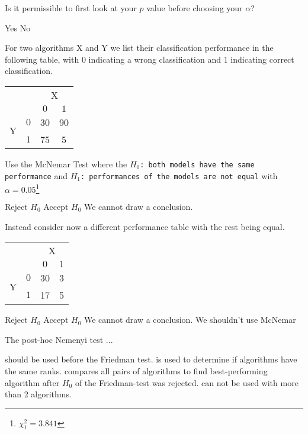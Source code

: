 \documentclass{exam}
\begin{document}
\begin{questions}
\question Is it permissible to first look at your $p$ value before choosing your $\alpha$?
\begin{choices}
    \choice Yes
    \choice No %
\end{choices}

\question For two algorithms X and Y we list their classification performance in the following table, with $0$ indicating a wrong classification and $1$ indicating correct classification.
    \begin{center}
      \begin{tabular}{cc|cc}
          & & \multicolumn{2}{c}{X} \\
          & & $0$ & $1$ \\
          \hline
          \multirow{2}{*}{Y} & $0$ & 30 & 90 \\
          & $1$ & 75 & 5 \\
      \end{tabular}
    \end{center}
    Use the McNemar Test where the \texttt{$H_0$: both models have the same performance} and \texttt{$H_1$: performances of the models are not equal}  with $\alpha = 0.05$\footnote{$\chi^2_1 = 3.841$}
\begin{choices}
    \choice Reject $H_0$
    \choice Accept $H_0$
    \choice We cannot draw a conclusion. %
\end{choices}

\question Instead consider now a different performance table with the rest being equal.
    \begin{center}
      \begin{tabular}{cc|cc}
          & & \multicolumn{2}{c}{X} \\
          & & $0$ & $1$ \\
          \hline
          \multirow{2}{*}{Y} & $0$ & 30 & 3 \\
          & $1$ & 17 & 5 \\
      \end{tabular}
    \end{center}
\begin{choices}
    \choice Reject $H_0$
    \choice Accept $H_0$
    \choice We cannot draw a conclusion.
    \choice We shouldn't use McNemar %
\end{choices}

\question The post-hoc Nemenyi test ...
\begin{choices}
    \choice should be used before the Friedman test.
    \choice is used to determine if algorithms have the same ranks.
    \choice compares all pairs of algorithms to find best-performing algorithm after $H_0$ of the
Friedman-test was rejected. %
\choice can not be used with more than 2 algorithms.
\end{choices}
\end{questions}
\end{document}

